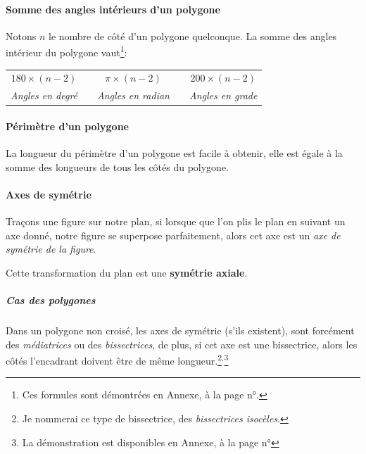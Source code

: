 \documentclass[a4paper, twoside]{article}
\begin{document}
\paragraph*{Somme des angles intérieurs d'un polygone}

Notons $n$ le nombre de côté d'un polygone quelconque. La somme des angles intérieur
du polygone vaut\footnote{Ces formules sont
	démontrées en Annexe, à la page n°\pageref*{demo_formule_lien_somme_angle_nb_cote}.}:

\begin{center}
	\begin{tabular}{ccccc}
		$180 \times (n-2)$       &               & $\pi \times (n-2)$        &               & $200 \times (n-2)$       \\
		\textit{Angles en degré} & \phantom{ccc} & \textit{Angles en radian} & \phantom{ccc} & \textit{Angles en grade} \\
	\end{tabular}
\end{center}

\medbreak

\paragraph*{Périmètre d'un polygone}

La longueur du périmètre d'un polygone est facile à obtenir,
elle est égale à la somme des longueurs de tous les côtés du polygone.

\paragraph*{Axes de symétrie}

Traçons une figure sur notre plan,
si lorsque que l'on plis le plan en suivant un axe donné,
notre figure se superpose parfaitement,
alors cet axe est un \emph{axe de symétrie de la figure}.

Cette transformation du plan est une \textbf{symétrie axiale}.

\subparagraph*{Cas des polygones}

Dans un polygone non croisé, les axes de symétrie (s'ils existent),
sont forcément des \emph{médiatrices} ou des \emph{bissectrices}, de plus,
si cet axe est une bissectrice, alors les côtés l'encadrant doivent être de même
longueur.\footnote{
	Je nommerai ce type de bissectrice, des \emph{bissectrices isocèles}.
}$^\text{,}$\footnote{
	La démonstration est disponibles en Annexe, à la page n°\pageref*{demo_axes_symétrie_polygone}
}
\end{document}
